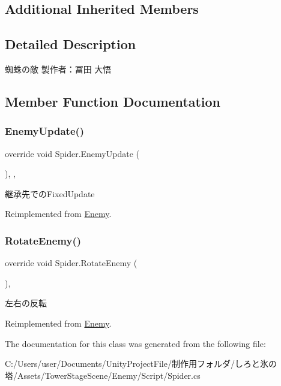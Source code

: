 \subsection*{Additional Inherited Members}


\subsection{Detailed Description}
蜘蛛の敵 製作者：冨田 大悟 



\subsection{Member Function Documentation}
\mbox{\label{class_spider_a343565aa379615a2602907dd25137ed9}} 
\subsubsection{\texorpdfstring{Enemy\+Update()}{EnemyUpdate()}}
{\footnotesize\ttfamily override void Spider.\+Enemy\+Update (\begin{DoxyParamCaption}{ }\end{DoxyParamCaption})\hspace{0.3cm}{\ttfamily [inline]}, {\ttfamily [protected]}, {\ttfamily [virtual]}}



継承先での\+Fixed\+Update 



Reimplemented from \hyperlink{class_enemy_ab19a73003a5b443ba93f4b6a45c0abad}{Enemy}.

\mbox{\label{class_spider_aeddc709039ca9a096e53ecc0dd0d3f84}} 
\subsubsection{\texorpdfstring{Rotate\+Enemy()}{RotateEnemy()}}
{\footnotesize\ttfamily override void Spider.\+Rotate\+Enemy (\begin{DoxyParamCaption}{ }\end{DoxyParamCaption})\hspace{0.3cm}{\ttfamily [inline]}, {\ttfamily [virtual]}}



左右の反転 



Reimplemented from \hyperlink{class_enemy_a2a0e665070fd362bd3ab2f2962ebff93}{Enemy}.



The documentation for this class was generated from the following file\+:\begin{DoxyCompactItemize}
\item 
C\+:/\+Users/user/\+Documents/\+Unity\+Project\+File/制作用フォルダ/しろと氷の塔/\+Assets/\+Tower\+Stage\+Scene/\+Enemy/\+Script/Spider.\+cs\end{DoxyCompactItemize}
